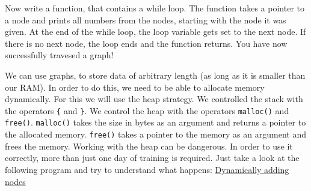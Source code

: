 \documentclass{dcbl/challenge}
\begin{document}
\begin{aufgabe}
    Now write a function, that contains a while loop.
    The function takes a pointer to a node and prints all numbers from the nodes, starting with the node it was given.
    At the end of the while loop, the loop variable gets set to the next node. 
    If there is no next node, the loop ends and the function returns. 
    You have now successfully travesed a graph! 
\end{aufgabe}

\begin{aufgabe}
    We can use graphs, to store data of arbitrary length (as long as it is smaller than our RAM).
    In order to do this, we need to be able to allocate memory dynamically.
    For this we will use the heap strategy. 
    We controlled the stack with the operators \texttt{\{} and \texttt{\}}.
    We control the heap with the operators \texttt{malloc()} and \texttt{free()}.
    \texttt{malloc()} takes the size in bytes as an argument and returns a pointer to the allocated memory.
    \texttt{free()} takes a pointer to the memory as an argument and frees the memory.
    Working with the heap can be dangerous.
    In order to use it correctly, more than just one day of training is required.
    Just take a look at the following program and try to understand what happens:
    \href{https://godbolt.org/#z:OYLghAFBqd5QCxAYwPYBMCmBRdBLAF1QCcAaPECAMzwBtMA7AQwFtMQByARg9KtQYEAysib0QXACx8BBAKoBnTAAUAHpwAMvAFYTStJg1AB9U8lJL6yAngGVG6AMKpaAVxYM9DgDJ4GmADl3ACNMYhAANgB2UgAHVAVCWwZnNw89eMSbAV9/IJZQ8OiLTCtshiECJmICVPdPLhKy5MrqglzAkLDImIUqmrr0xr62jvzCnoBKC1RXYmR2DgBSACYAZj9kNywAaiW1xz78VAA6BH3sJY0AQVWNhi3XXf3DgnRaPGCzi6vbm4IAJ6xTBYKg7PrEVzWHYMDCYPZRABCvx2qJ2fgIO3QTCq%2B2RNzR4IIkOhsKwACoYZhVAQ8b8llEACIwuF0m6/MmYSnIYiYHGYYyciAYrE4piTBH466EzmU/wAdwCcL2a2ZLDEtFQyAgiQAXphUFQIJzJpM2dK0XgwRAwGAFUqsBKGVLCYTYsQMUbVisALKYFgkAE7MLEEhLACsjgY3rNaxdrtRvIIcwYOwCcm83nNhIZjJRaPtcIAtBdsVUVcyy0xswXMIrixd/DSK2mM1m4/nE5hk8RU4WsObc/SbrL0QwlDVBXDjXDKQg%2BehSGPMVWnUjOyyKVT689VTseXyCAKhaua6irTsbWB50x0Gv4wmAPSPnYAdUYqfw8N8fXh9DC6J9BuhI3ugLb9pgZ4IsypRKJKwFos%2BOxCFC86igoOzYAwuxYMQOw/keCGoqOR4sLELagVBhLyggdDwhApGxCWaxYdSBD3kRrqMS2jHMaxNJUWiQ4EgmOxIQAYksjhrEsiKOMA8JYH2mCuIwOwANKwkeqa0QwuquJxvGNmx4F1g6kEdiJqLCRaXY9jpC6Dkyw7XAAbqgeBge6GLGB8fQzluoEcVZm5cjs3H7MylGWbZOw0XRl6McFsVuh6gheisKzXOgvIKHBWAYdg9BsIICggHsKzhrEEZRt6pBJYJqLeelEDeq6ACSDAIGIK4AeZ5WrOG6A1dGmVLkZLGnjFok7M1BAZSshIBFJMnXJIyAIL%2BhXFYwBADZV1WRqNKzjf6THGTSsYPlxZ08WdfFNrS01Cc5IVzQt6aZiNMZOXm7I3O5nk7FQvICn5BABWFQXwSFJFnVB8X0Je0POoZt2RTs0XXSBC4UQuD1sY1wOgwxZ1XRuNmUzcIrqn4EDJTKs6Y7jGOfe212gS2fgTgQU5YBAoFLlw5MhZzGPc2EvNCoLOwrCLsVi3uEuTtLC5Lms8s47eXPjpLfOYALas7JImtonNvl4P5QVQSDmBg5bEPW89dkpjsGi/b8HDTLQnDhrwngcFopCoJwjjgrM8zwncPD1ZoXvTAA1iA4ZcCcEThhEXAp5IXAAJzhuGAAcawRPonCSP7cfB5wvBlRoseB17pBwLASDUpgyCuEQZAUBA1TAAoyiGKUQgIKg8oBzHaBkXQOLJEP/i0KP48B0H0%2BxHR4TIMAXBrI06%2BbwErCLLwB/0MQADyXfLxPVft8g1zEAPNekPflT4AHvD8IIIhiOwUgyEEIoFQ6hG6kF0I0AwRgQCmGMOYD4wQyqQGmKgWI5QyocF4KgVyIZPKYCQfTUgkJBB4DYAAFVQC4Ah0wFARwWHoI4fgF4jzHrfbgvB5TECYLETgPBva%2B0rmAkOHBsCqA7l3EgOxVCFwiEWCIkgdjAGQMgHYu8ThcEvI4JcuBCCSOjpMXge1G6mlIKBbohCk6SELicNYkg1iFysUXDQkgc7yLLhwCupBV5YJfnXBuWgTE%2Bw4CsQRQdhGGLjiYnBxBEh2EkEAA}{Dynamically adding nodes}
\end{aufgabe}
\end{document}
